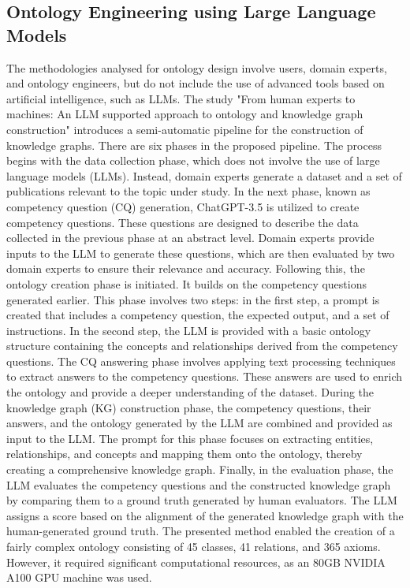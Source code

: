 \subsection{Ontology Engineering using Large Language Models}
The methodologies analysed for ontology design involve users, domain experts, and ontology engineers, but do not include the use of advanced tools based on artificial intelligence, such as LLMs. The study "From human experts to machines: An LLM supported approach to ontology and knowledge graph construction" \cite{kommineni2024human} introduces a semi-automatic pipeline for the construction of knowledge graphs. There are six phases in the proposed pipeline.
The process begins with the data collection phase, which does not involve the use of large language models (LLMs). Instead, domain experts generate a dataset and a set of publications relevant to the topic under study.
In the next phase, known as competency question (CQ) generation, ChatGPT-3.5 is utilized to create competency questions. These questions are designed to describe the data collected in the previous phase at an abstract level. Domain experts provide inputs to the LLM to generate these questions, which are then evaluated by two domain experts to ensure their relevance and accuracy. Following this, the ontology creation phase is initiated. It builds on the competency questions generated earlier. This phase involves two steps: in the first step, a prompt is created that includes a competency question, the expected output, and a set of instructions. In the second step, the LLM is provided with a basic ontology structure containing the concepts and relationships derived from the competency questions.
The CQ answering phase involves applying text processing techniques to extract answers to the competency questions. These answers are used to enrich the ontology and provide a deeper understanding of the dataset.
During the knowledge graph (KG) construction phase, the competency questions, their answers, and the ontology generated by the LLM are combined and provided as input to the LLM. The prompt for this phase focuses on extracting entities, relationships, and concepts and mapping them onto the ontology, thereby creating a comprehensive knowledge graph.
Finally, in the evaluation phase, the LLM evaluates the competency questions and the constructed knowledge graph by comparing them to a ground truth generated by human evaluators. The LLM assigns a score based on the alignment of the generated knowledge graph with the human-generated ground truth.
The presented method enabled the creation of a fairly complex ontology consisting of 45 classes, 41 relations, and 365 axioms. However, it required significant computational resources, as an 80GB NVIDIA A100 GPU machine was used. 
